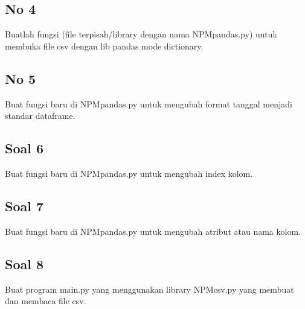 

\subsection{No 4}
Buatlah fungsi (file terpisah/library dengan nama NPMpandas.py) untuk membuka file csv dengan lib pandas mode dictionary.



\subsection{No 5}
Buat fungsi baru di NPMpandas.py untuk mengubah format tanggal menjadi standar dataframe.



\subsection{Soal 6}
Buat fungsi baru di NPMpandas.py untuk mengubah index kolom.



\subsection{Soal 7}
Buat fungsi baru di NPMpandas.py untuk mengubah atribut atau nama kolom.



\subsection{Soal 8}
Buat program main.py yang menggunakan library NPMcsv.py yang membuat dan membaca file csv.



